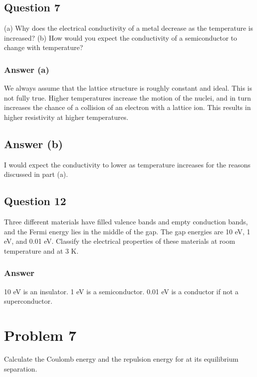 \documentclass[12pt]{article}
\begin{document}
    \subsection{Question 7}
        (a) Why does the electrical conductivity of a metal decrease as the temperature is increased? 
        (b) How would you expect the conductivity of a semiconductor to change with temperature?

        \subsubsection{Answer (a)}
            We always assume that the lattice structure is roughly constant and ideal. 
            This is not fully true. 
            Higher temperatures increase the motion of the nuclei, and in turn increases the chance of a collision of an electron with a lattice ion.
            This results in higher resistivity at higher temperatures.
        
        \subsection{Answer (b)}
            I would expect the conductivity to lower as temperature increases for the reasons discussed in part (a).

    \subsection{Question 12}
        Three different materials have filled valence bands and empty conduction bands, and the Fermi energy lies in the middle of the gap. 
        The gap energies are 10 eV, 1 eV, and 0.01 eV. 
        Classify the electrical properties of these materials at room temperature and at 3 K.

        \subsubsection{Answer}
            10 eV is an insulator.
            1 eV is a semiconductor.
            0.01 eV is a conductor if not a superconductor.
        
    \pagebreak

\section{Problem 7}
    Calculate the Coulomb energy and the repulsion energy for  at its equilibrium separation.
\end{document}
